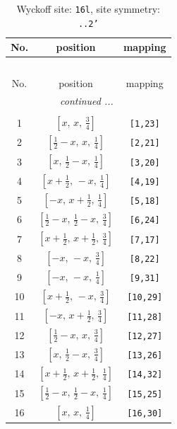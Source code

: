 \documentclass[fleqn,8pt]{jsarticle}
\begin{document}
\renewcommand{\arraystretch}{1.2}
\begin{longtable}{ccc}
\caption{Wyckoff site: {\tt 16l}, site symmetry: {\tt ..2'}}
 \\
 \hline \hline
No. & position & mapping \\ \hline \endfirsthead

\multicolumn{2}{l}{\tablename\ \thetable{}} \\
 \hline \hline
No. & position & mapping \\ \hline \endhead

 \hline \hline
\multicolumn{2}{r}{\footnotesize\it continued ...} \\ \endfoot

 \hline \hline
\multicolumn{2}{r}{} \\ \endlastfoot

1 & $\left[ x,\, x,\, \frac{3}{4} \right]$ & {\tt [1,23]} \\ \hline
2 & $\left[ \frac{1}{2} - x,\, x,\, \frac{1}{4} \right]$ & {\tt [2,21]} \\ \hline
3 & $\left[ x,\, \frac{1}{2} - x,\, \frac{1}{4} \right]$ & {\tt [3,20]} \\ \hline
4 & $\left[ x + \frac{1}{2},\, - x,\, \frac{1}{4} \right]$ & {\tt [4,19]} \\ \hline
5 & $\left[ - x,\, x + \frac{1}{2},\, \frac{1}{4} \right]$ & {\tt [5,18]} \\ \hline
6 & $\left[ \frac{1}{2} - x,\, \frac{1}{2} - x,\, \frac{3}{4} \right]$ & {\tt [6,24]} \\ \hline
7 & $\left[ x + \frac{1}{2},\, x + \frac{1}{2},\, \frac{3}{4} \right]$ & {\tt [7,17]} \\ \hline
8 & $\left[ - x,\, - x,\, \frac{3}{4} \right]$ & {\tt [8,22]} \\ \hline
9 & $\left[ - x,\, - x,\, \frac{1}{4} \right]$ & {\tt [9,31]} \\ \hline
10 & $\left[ x + \frac{1}{2},\, - x,\, \frac{3}{4} \right]$ & {\tt [10,29]} \\ \hline
11 & $\left[ - x,\, x + \frac{1}{2},\, \frac{3}{4} \right]$ & {\tt [11,28]} \\ \hline
12 & $\left[ \frac{1}{2} - x,\, x,\, \frac{3}{4} \right]$ & {\tt [12,27]} \\ \hline
13 & $\left[ x,\, \frac{1}{2} - x,\, \frac{3}{4} \right]$ & {\tt [13,26]} \\ \hline
14 & $\left[ x + \frac{1}{2},\, x + \frac{1}{2},\, \frac{1}{4} \right]$ & {\tt [14,32]} \\ \hline
15 & $\left[ \frac{1}{2} - x,\, \frac{1}{2} - x,\, \frac{1}{4} \right]$ & {\tt [15,25]} \\ \hline
16 & $\left[ x,\, x,\, \frac{1}{4} \right]$ & {\tt [16,30]} \\
\end{longtable}
\end{document}
